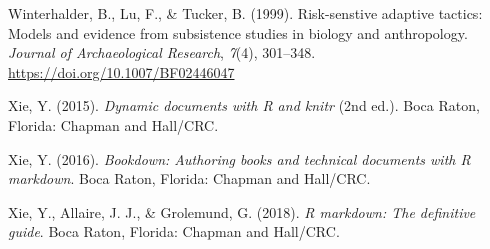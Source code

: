 \documentclass[
  ,man,mask,floatsintext]{apa6}
\newlength{\cslhangindent}
\newlength{\cslentryspacingunit} %
\newenvironment{CSLReferences}[2] %
 {%
  \setlength{\parindent}{0pt}
  \ifodd #1
  \let\oldpar\par
  \def\par{\hangindent=\cslhangindent\oldpar}
  \fi
  \setlength{\parskip}{#2\cslentryspacingunit}
 }%
 {}
\begin{document}
\begin{CSLReferences}{1}{0}
\leavevmode{}%
Winterhalder, B., Lu, F., \& Tucker, B. (1999). Risk-senstive adaptive tactics: {Models} and evidence from subsistence studies in biology and anthropology. \emph{Journal of Archaeological Research}, \emph{7}(4), 301--348. \url{https://doi.org/10.1007/BF02446047}

\leavevmode{}%
Xie, Y. (2015). \emph{Dynamic documents with {R} and knitr} (2nd ed.). Boca Raton, Florida: {Chapman and Hall/CRC}.

\leavevmode{}%
Xie, Y. (2016). \emph{Bookdown: {Authoring} books and technical documents with {R} markdown}. Boca Raton, Florida: {Chapman and Hall/CRC}.

\leavevmode{}%
Xie, Y., Allaire, J. J., \& Grolemund, G. (2018). \emph{R markdown: {The} definitive guide}. Boca Raton, Florida: {Chapman and Hall/CRC}.

\end{CSLReferences}
\end{document}
